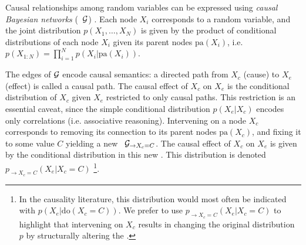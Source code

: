 
Causal relationships among random variables can be expressed using \emph{causal Bayesian networks} (\CBNs~${\cal G}$)  \citep{pearl2000,spirtes2000causation,dawid07fundamentals}. Each node $X_i$ corresponds to a random variable, and the joint distribution $p(X_1, \ldots, X_N)$ is given by the product of conditional distributions of each node $X_i$ given its parent nodes $\textrm{pa}(X_i)$, i.e.~$p(X_{1:N})=\prod_{i=1}^Np(X_i|\textrm{pa}(X_i))$. 

The edges of ${\cal G}$ encode causal semantics: a directed path from $X_c$ (cause) to $X_e$ (effect) is called a causal path. The causal effect of $X_c$ on $X_e$ is the conditional distribution of $X_c$ given $X_e$ restricted to only causal paths. This restriction is an essential caveat, since the simple conditional distribution \(p(X_e|X_c)\) encodes only correlations (i.e. associative reasoning). Intervening on a node $X_c$ corresponds to removing its connection to its parent nodes  $\textrm{pa}(X_c)$, and fixing it to some value $C$ yielding a new \CBN~${\cal G}_{\rightarrow X_c = C}$. The causal effect of $X_c$ on $X_e$ is given by the conditional distribution in this new \CBN. This distribution is denoted $p_{\rightarrow X_c = C}(X_e|X_c = C)$
\footnote{In the causality literature, this distribution would most often be indicated with $p(X_e|\textrm{do}(X_c = C))$. We prefer to use $p_{\rightarrow X_c = C}(X_e|X_c = C)$ to highlight that intervening on $X_c$ results in changing the original distribution $p$ by structurally altering the \CBN.}. 


